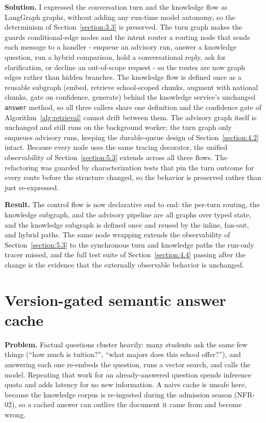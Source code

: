 \documentclass[../main.tex]{subfiles}
\begin{document}
\textbf{Solution.}
I expressed the conversation turn and the knowledge flow as LangGraph graphs, without adding any run-time model autonomy, so the determinism of Section~\ref{section:3.3} is preserved.
The turn graph makes the guards conditional-edge nodes and the intent router a routing node that sends each message to a handler - enqueue an advisory run, answer a knowledge question, run a hybrid comparison, hold a conversational reply, ask for clarification, or decline an out-of-scope request - so the routes are now graph edges rather than hidden branches.
The knowledge flow is defined once as a reusable subgraph (embed, retrieve school-scoped chunks, augment with national chunks, gate on confidence, generate) behind the knowledge service's unchanged \texttt{answer} method, so all three callers share one definition and the confidence gate of Algorithm~\ref{alg:retrieval} cannot drift between them.
The advisory graph itself is unchanged and still runs on the background worker; the turn graph only enqueues advisory runs, keeping the durable-queue design of Section~\ref{section:4.2} intact.
Because every node uses the same tracing decorator, the unified observability of Section~\ref{section:5.3} extends across all three flows.
The refactoring was guarded by characterization tests that pin the turn outcome for every route before the structure changed, so the behavior is preserved rather than just re-expressed.

\textbf{Result.}
The control flow is now declarative end to end: the per-turn routing, the knowledge subgraph, and the advisory pipeline are all graphs over typed state, and the knowledge subgraph is defined once and reused by the inline, fan-out, and hybrid paths.
The same node wrapping extends the observability of Section~\ref{section:5.3} to the synchronous turn and knowledge paths the run-only tracer missed, and the full test suite of Section~\ref{section:4.4} passing after the change is the evidence that the externally observable behavior is unchanged.

\section{Version-gated semantic answer cache}
\label{section:5.5}

\textbf{Problem.}
Factual questions cluster heavily: many students ask the same few things (``how much is tuition?'', ``what majors does this school offer?''), and answering each one re-embeds the question, runs a vector search, and calls the model.
Repeating that work for an already-answered question spends inference quota and adds latency for no new information.
A naive cache is unsafe here, because the knowledge corpus is re-ingested during the admission season (NFR-02), so a cached answer can outlive the document it came from and become wrong.
\end{document}
